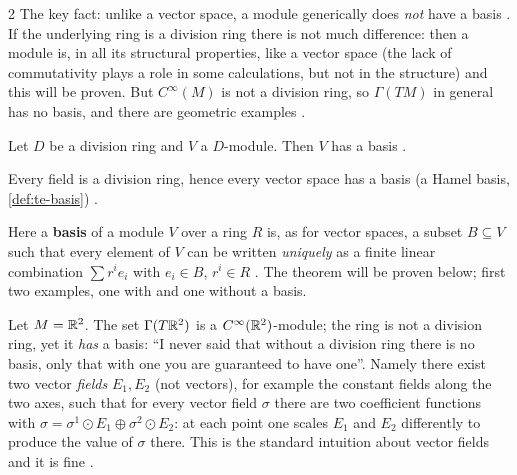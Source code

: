 \begin{paracol}{2}
The key fact: unlike a vector space, a module generically does \emph{not} have a basis  . If the underlying ring is a division ring there is not much difference: then a module is, in all its structural properties, like a vector space (the lack of commutativity plays a role in some calculations, but not in the
structure) and this will be proven. But $C^\infty(M)$ is not a division ring, so $\Gamma(TM)$ in general has no basis, and there are geometric examples      .

\begin{theorem}\label{thm:rm-basis}
Let $D$ be a division ring and $V$ a $D$-module. Then $V$ has a basis   .
\end{theorem}
\begin{corollary}\label{cor:rm-vs}
Every field is a division ring, hence every vector space has a basis (a Hamel basis, \cref{def:te-basis})  .
\end{corollary}
Here a \textbf{basis} of a module $V$ over a ring $R$ is, as for vector spaces, a subset $B\subseteq V$ such that every element of $V$ can be written \emph{uniquely} as a finite linear combination $\sum r^ie_i$ with $e_i\in B$, $r^i\in R$ . The theorem will be proven below; first two examples, one with and one without a basis.

\begin{example}\label{ex:rm-r2}
Let $M=\mathbb{R}^2$. The set $\Gamma(T\mathbb{R}^2)$ is a $C^\infty(\mathbb{R}^2)$-module; the ring is not a division ring, yet it \emph{has} a basis: ``I never said that without a division ring there is no basis, only that with one you are guaranteed to have one''. Namely there exist two vector \emph{fields} $E_1,E_2$ (not vectors), for example the constant fields
along the two axes, such that for every vector field $\sigma$ there are two coefficient functions with $\sigma=\sigma^1\odot E_1\oplus\sigma^2\odot E_2$: at each point one scales $E_1$ and $E_2$ differently to produce the value of $\sigma$ there. This is the standard intuition about vector fields and it is fine
            .
\end{example}


\end{paracol}
